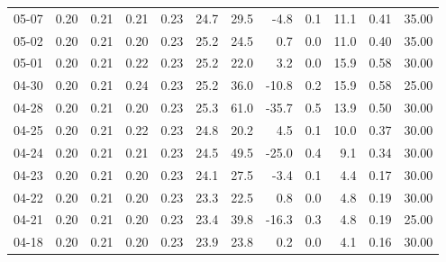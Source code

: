 \begin{threeparttable}
{\begin{tabular}{lrrrrrrrrrrr}
  05-07 &          0.20 &          0.21 &          0.21 &        0.23 &                24.7 &                29.5 &       -4.8 &                 0.1 &             11.1 &            0.41 &                  35.00 \\
  05-02 &          0.20 &          0.21 &          0.20 &        0.23 &                25.2 &                24.5 &        0.7 &                 0.0 &             11.0 &            0.40 &                  35.00 \\
  05-01 &          0.20 &          0.21 &          0.22 &        0.23 &                25.2 &                22.0 &        3.2 &                 0.0 &             15.9 &            0.58 &                  30.00 \\
  04-30 &          0.20 &          0.21 &          0.24 &        0.23 &                25.2 &                36.0 &      -10.8 &                 0.2 &             15.9 &            0.58 &                  25.00 \\
  04-28 &          0.20 &          0.21 &          0.20 &        0.23 &                25.3 &                61.0 &      -35.7 &                 0.5 &             13.9 &            0.50 &                  30.00 \\
  04-25 &          0.20 &          0.21 &          0.22 &        0.23 &                24.8 &                20.2 &        4.5 &                 0.1 &             10.0 &            0.37 &                  30.00 \\
  04-24 &          0.20 &          0.21 &          0.21 &        0.23 &                24.5 &                49.5 &      -25.0 &                 0.4 &              9.1 &            0.34 &                  30.00 \\
  04-23 &          0.20 &          0.21 &          0.20 &        0.23 &                24.1 &                27.5 &       -3.4 &                 0.1 &              4.4 &            0.17 &                  30.00 \\
  04-22 &          0.20 &          0.21 &          0.20 &        0.23 &                23.3 &                22.5 &        0.8 &                 0.0 &              4.8 &            0.19 &                  30.00 \\
  04-21 &          0.20 &          0.21 &          0.20 &        0.23 &                23.4 &                39.8 &      -16.3 &                 0.3 &              4.8 &            0.19 &                  25.00 \\
  04-18 &          0.20 &          0.21 &          0.20 &        0.23 &                23.9 &                23.8 &        0.2 &                 0.0 &              4.1 &            0.16 &                  30.00 \\

\end{tabular}}
\end{threeparttable}
